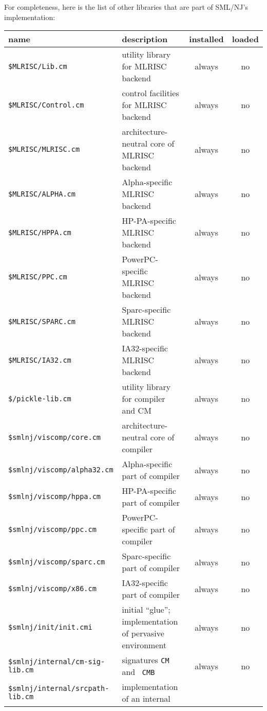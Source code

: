 \documentclass[titlepage,letterpaper]{article}
\begin{document}
For completeness, here is the list of other libraries that are part of
SML/NJ's implementation:

\begin{center}
\begin{tabular}{p{2.9in}||p{2.2in}|c|c}
name & description & installed & loaded \\
\hline\hline
{\tt \$MLRISC/Lib.cm} & utility library for MLRISC backend & always &
no \\
\hline 
{\tt \$MLRISC/Control.cm} & control facilities for MLRISC backend &
always & no \\
\hline
{\tt \$MLRISC/MLRISC.cm} & architecture-neutral core of MLRISC backend
& always & no \\
\hline
{\tt \$MLRISC/ALPHA.cm} & Alpha-specific MLRISC backend & always & no \\
\hline
{\tt \$MLRISC/HPPA.cm} & HP-PA-specific MLRISC backend & always & no \\
\hline
{\tt \$MLRISC/PPC.cm} & PowerPC-specific MLRISC backend & always & no \\
\hline
{\tt \$MLRISC/SPARC.cm} & Sparc-specific MLRISC backend & always & no \\
\hline 
{\tt \$MLRISC/IA32.cm} & IA32-specific MLRISC backend & always & no \\
\hline\hline
{\tt \$/pickle-lib.cm} & utility library for compiler and CM & always & no \\
\hline
{\tt \$smlnj/viscomp/core.cm} & architecture-neutral core of compiler
& always & no \\
\hline
{\tt \$smlnj/viscomp/alpha32.cm} & Alpha-specific part of compiler &
always & no \\
\hline
{\tt \$smlnj/viscomp/hppa.cm} & HP-PA-specific part of compiler &
always & no \\
\hline
{\tt \$smlnj/viscomp/ppc.cm} & PowerPC-specific part of compiler &
always & no \\
\hline
{\tt \$smlnj/viscomp/sparc.cm} & Sparc-specific part of compiler &
always & no \\
\hline
{\tt \$smlnj/viscomp/x86.cm} & IA32-specific part of compiler & always
& no \\
\hline \hline
{\tt \$smlnj/init/init.cmi} & initial ``glue''; implementation of
pervasive environment & always & no \\
\hline \hline
{\tt \$smlnj/internal/cm-sig-lib.cm} & signatures {\tt CM} and {\tt
CMB} & always & no \\
\hline
{\tt \$smlnj/internal/srcpath-lib.cm} & implementation of an internal

\end{tabular}
\end{center}
\end{document}
